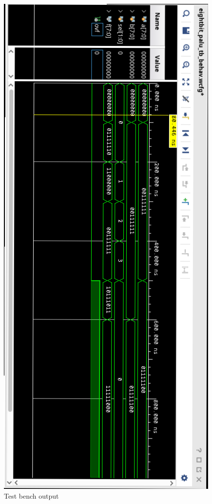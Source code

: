 \documentclass[12pt,a4paper]{article}
\begin{document}
\begin{figure}[h]
	\centering
	\includegraphics{image}
	\caption{Test bench output}
\end{figure}
\end{document}
